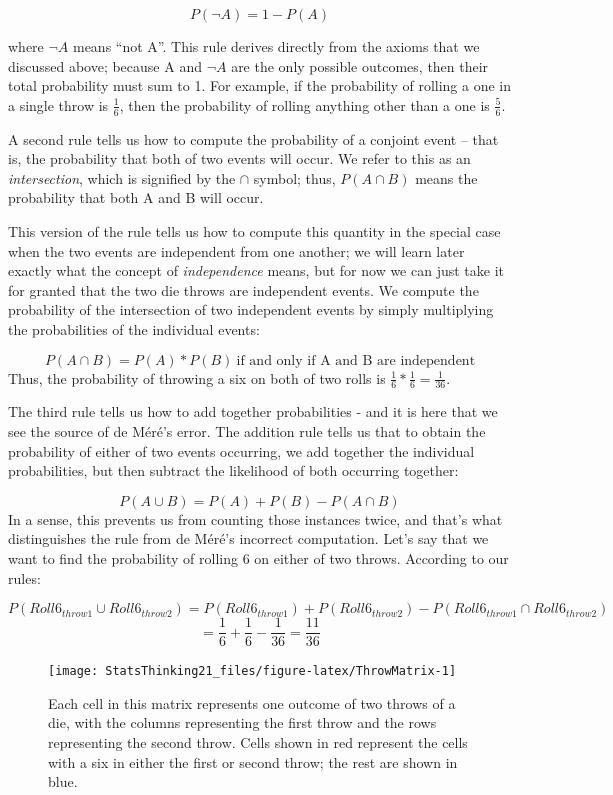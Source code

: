 \documentclass[12pt,]{book}
\theoremstyle{definition}
\theoremstyle{definition}
\theoremstyle{definition}
\theoremstyle{remark}
\begin{document}
\[
P(\neg A) = 1 - P(A)
\]

where \(\neg A\) means ``not A''. This rule derives directly from the axioms that we discussed above; because A and \(\neg A\) are the only possible outcomes, then their total probability must sum to 1. For example, if the probability of rolling a one in a single throw is \(\frac{1}{6}\), then the probability of rolling anything other than a one is \(\frac{5}{6}\).

A second rule tells us how to compute the probability of a conjoint event -- that is, the probability that both of two events will occur. We refer to this as an \emph{intersection}, which is signified by the \(\cap\) symbol; thus, \(P(A \cap B)\) means the probability that both A and B will occur.

This version of the rule tells us how to compute this quantity in the special case when the two events are independent from one another; we will learn later exactly what the concept of \emph{independence} means, but for now we can just take it for granted that the two die throws are independent events. We compute the probability of the intersection of two independent events by simply multiplying the probabilities of the individual events:

\[
P(A \cap B) = P(A) * P(B)\ \text{if and only if A and B are independent}
\]
Thus, the probability of throwing a six on both of two rolls is \(\frac{1}{6}*\frac{1}{6}=\frac{1}{36}\).

The third rule tells us how to add together probabilities - and it is here that we see the source of de Méré's error. The addition rule tells us that to obtain the probability of either of two events occurring, we add together the individual probabilities, but then subtract the likelihood of both occurring together:

\[
P(A \cup B) = P(A) + P(B) - P(A \cap B)
\]
In a sense, this prevents us from counting those instances twice, and that's what distinguishes the rule from de Méré's incorrect computation. Let's say that we want to find the probability of rolling 6 on either of two throws. According to our rules:

\[
P(Roll6_{throw1} \cup Roll6_{throw2}) = P(Roll6_{throw1}) + P(Roll6_{throw2}) - P(Roll6_{throw1} \cap Roll6_{throw2}) 
\]
\[
= \frac{1}{6} + \frac{1}{6} - \frac{1}{36} = \frac{11}{36}
\]

\begin{figure}
\texttt{[image: StatsThinking21\_files/figure-latex/ThrowMatrix-1]} \caption{Each cell in this matrix represents one outcome of two throws of a die, with the columns representing the first throw and the rows representing the second throw. Cells shown in red represent the cells with a six in either the first or second throw; the rest are shown in blue.}\label{fig:ThrowMatrix}
\end{figure}
\end{document}
